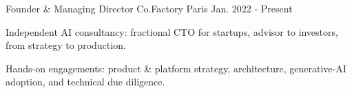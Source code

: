 

\begin{cventries}

  \cventry
    {Founder \& Managing Director} %
    {Co.Factory} %
    {Paris} %
    {Jan. 2022 - Present} %
    {
      \begin{cvitems} %
        \item {Independent AI consultancy: fractional CTO for startups, advisor to investors, from strategy to production.}
        \item {Hands-on engagements: product \& platform strategy, architecture, generative-AI adoption, and technical due diligence.}
      \end{cvitems}
    }


\end{cventries}
